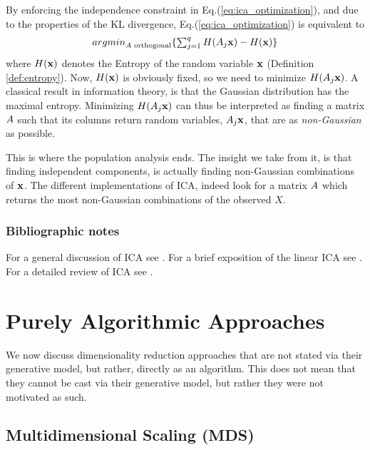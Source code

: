 \documentclass[12pt,a4paper]{article}
\begin{document}
By enforcing the independence constraint in Eq.(\ref{eq:ica_optimization}), and due to the properties of the KL divergence, Eq.(\ref{eq:ica_optimization}) is equivalent to
\begin{align}
\label{eq:ica_optimization2}
\textstyle{\mathop{argmin}_{A\text{ orthogonal}}}\{ \sum_{j=1}^{q} H(A_j\mathbf{x})- H(\mathbf{x}) \}
\end{align}
where $H(\mathbf{x})$ denotes the Entropy of the random variable $\mathbf{x}$ (Definition \ref{def:entropy}).
Now, $H(\mathbf{x})$ is obviously fixed, so we need to minimize $H(A_j\mathbf{x})$. 
A classical result in information theory, is that the Gaussian distribution has the maximal entropy. 
Minimizing $H(A_j\mathbf{x})$ can thus be interpreted as finding a matrix $A$ such that its columns return random variables, $A_j\mathbf{x}$, that are as \emph{non-Gaussian} as possible.

This is where the population analysis ends. 
The insight we take from it, is that finding independent components, is actually finding non-Gaussian combinations of $\mathbf{x}$. 
The different implementations of ICA, indeed look for a matrix $A$ which returns the most non-Gaussian combinations of the observed $X$. 








\subsubsection{Bibliographic notes}
For a general discussion of ICA see \cite{jolliffe2002principal}.
For a brief exposition of the linear ICA see \cite{friedman2001elements}. 
For a detailed review of ICA see \cite{hyvarinen2000independent}. 








\section{Purely Algorithmic Approaches}

We now discuss dimensionality reduction approaches that are not stated via their generative model, but rather, directly as an algorithm.
This does not mean that they cannot be cast via their generative model, but rather they were not motivated as such.



\subsection{Multidimensional Scaling (MDS)}
\label{sec:mds}
\end{document}
